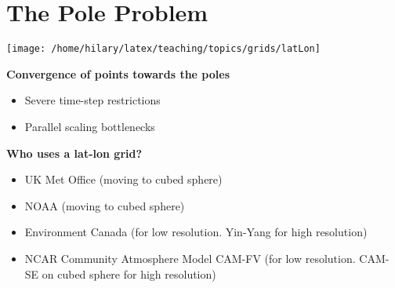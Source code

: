 \clearpage{}

\begin{minipage}[t]{0.4\columnwidth}%

\section*{The Pole Problem}

\texttt{[image: /home/hilary/latex/teaching/topics/grids/latLon]}%
\end{minipage}\hfill{}%
\begin{minipage}[t]{0.55\columnwidth}%
\textbf{Convergence of points towards the poles}
\begin{itemize}
\item Severe time-step restrictions
\item Parallel scaling bottlenecks
\end{itemize}
\bigskip{}

\textbf{Who uses a lat-lon grid?}
\begin{itemize}
\item UK Met Office (moving to cubed sphere)
\item NOAA (moving to cubed sphere)
\item Environment Canada (for low resolution. Yin-Yang for high resolution)
\item NCAR Community Atmosphere Model CAM-FV (for low resolution. CAM-SE
on cubed sphere for high resolution)
\end{itemize}
%
\end{minipage}

\clearpage{}

